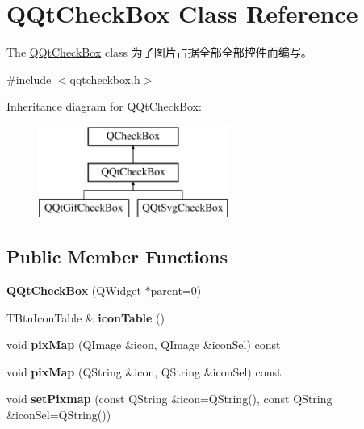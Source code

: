 \hypertarget{class_q_qt_check_box}{}\section{Q\+Qt\+Check\+Box Class Reference}
\label{class_q_qt_check_box}


The \mbox{\hyperlink{class_q_qt_check_box}{Q\+Qt\+Check\+Box}} class 为了图片占据全部全部控件而编写。  




{\ttfamily \#include $<$qqtcheckbox.\+h$>$}

Inheritance diagram for Q\+Qt\+Check\+Box\+:\begin{figure}[H]
\begin{center}
\leavevmode
\includegraphics[height=3.000000cm]{class_q_qt_check_box}
\end{center}
\end{figure}
\subsection*{Public Member Functions}
\begin{DoxyCompactItemize}
\item 
\mbox{\label{class_q_qt_check_box_a7410927953f1cef2e2f4f4b67291b902}} 
{\bfseries Q\+Qt\+Check\+Box} (Q\+Widget $\ast$parent=0)
\item 
\mbox{\label{class_q_qt_check_box_ae8ea6f8413e3839e2d82280d24b39e4f}} 
T\+Btn\+Icon\+Table \& {\bfseries icon\+Table} ()
\item 
\mbox{\label{class_q_qt_check_box_a6a9c2328e6c5e1c9a505226e647e7af7}} 
void {\bfseries pix\+Map} (Q\+Image \&icon, Q\+Image \&icon\+Sel) const
\item 
\mbox{\label{class_q_qt_check_box_a1becee4cd270ca1fc733d38e60e55f10}} 
void {\bfseries pix\+Map} (Q\+String \&icon, Q\+String \&icon\+Sel) const
\item 
\mbox{\label{class_q_qt_check_box_afd6f4abb21b72786dd9b3488fef18bbe}} 
void {\bfseries set\+Pixmap} (const Q\+String \&icon=Q\+String(), const Q\+String \&icon\+Sel=Q\+String())
\end{DoxyCompactItemize}

